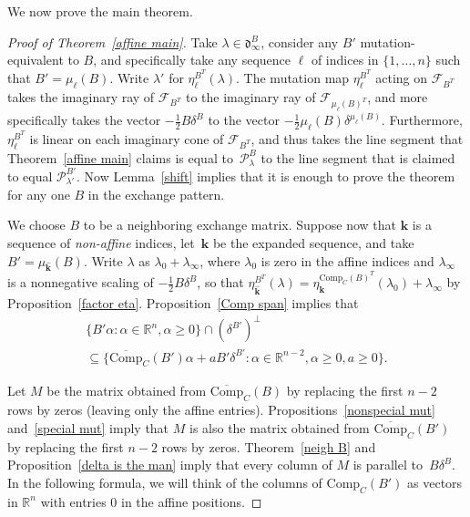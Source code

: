 \documentclass{amsart}
\theoremstyle{definition}
\theoremstyle{remark}
\numberwithin{equation}{section}
\newcommand{\reals}{\mathbb R}
\newcommand{\set}[1]{{\lbrace #1 \rbrace}}
\newcommand{\F}{{\mathcal F}}
\newcommand{\0}{{\mathbf{0}}}
\newcommand{\Comp}{\mathrm{Comp}_C}
\newcommand{\CompPlus}{\overline{\mathrm{Comp}}_C}
\newcommand{\kk}{{\boldsymbol{k}}}
\renewcommand{\ll}{{\boldsymbol\ell}}
\renewcommand{\P}{\mathcal{P}}
\renewcommand{\d}{{\mathfrak d}}
\begin{document}
We now prove the main theorem.

\begin{proof}[Proof of Theorem~\ref{affine main}]
Take $\lambda\in\d_\infty^B$, consider any $B'$ mutation-equivalent to $B$, and specifically take any sequence $\ll$ of indices in $\set{1,\ldots,n}$ such that $B'=\mu_\ll(B)$.
Write $\lambda'$ for $\eta_\ll^{B^T}(\lambda)$.
The mutation map $\eta_\ll^{B^T}$ acting on $\F_{B^T}$ takes the imaginary ray of $\F_{B^T}$ to the imaginary ray of $\F_{\mu_\ll(B)^T}$, and more specifically takes the vector $-\frac12B\delta^B$ to the vector $-\frac12\mu_\ll(B)\delta^{\mu_\ll(B)}$.
Furthermore, $\eta_\ll^{B^T}$ is linear on each imaginary cone of $\F_{B^T}$, and thus takes the line segment that Theorem~\ref{affine main} claims is equal to~$\P_\lambda^B$ to the line segment that is claimed to equal $\P_{\lambda'}^{B'}$.
Now Lemma~\ref{shift} implies that it is enough to prove the theorem for any one $B$ in the exchange pattern.

We choose $B$ to be a neighboring exchange matrix.
Suppose now that $\kk$ is a sequence of \emph{non-affine} indices, let~$\widehat\kk$ be the expanded sequence, and take ${B'=\mu_{\widehat\kk}(B)}$.
Write $\lambda$ as $\lambda_0+\lambda_\infty$, where $\lambda_0$ is zero in the affine indices and $\lambda_\infty$ is a nonnegative scaling of $-\frac12B\delta^B$, so that ${\eta^{B^T}_{\widehat\kk}(\lambda)=\eta_\kk^{\Comp(B)^T}(\lambda_0)+\lambda_\infty}$ by Proposition~\ref{factor eta}.
Proposition~\ref{Comp span} implies that 
\begin{multline*}
\set{B'\alpha:\alpha\in\reals^n,\alpha\ge0}\cap(\delta^{B'})^\perp\\
\subseteq\set{\CompPlus(B')\alpha+aB'\delta^{B'}:\alpha\in\reals^{n-2},\alpha\ge0,a\ge0}.
\end{multline*}

Let $M$ be the matrix obtained from $\CompPlus(B)$ by replacing the first $n-2$ rows by zeros (leaving only the affine entries).
Propositions~\ref{nonspecial mut} and~\ref{special mut} imply that $M$ is also the matrix obtained from $\CompPlus(B')$ by replacing the first $n-2$ rows by zeros.
Theorem~\ref{neigh B} and Proposition~\ref{delta is the man} imply that every column of $M$ is parallel to~$B\delta^B$.
In the following formula, we will think of the columns of $\Comp(B')$ as vectors in $\reals^n$ with entries $0$ in the affine positions.


\end{proof}
\end{document}
